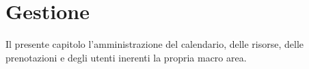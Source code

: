 \chapter{Gestione}
Il presente capitolo l'amministrazione del calendario, delle risorse, delle prenotazioni
e degli utenti inerenti la propria macro area.